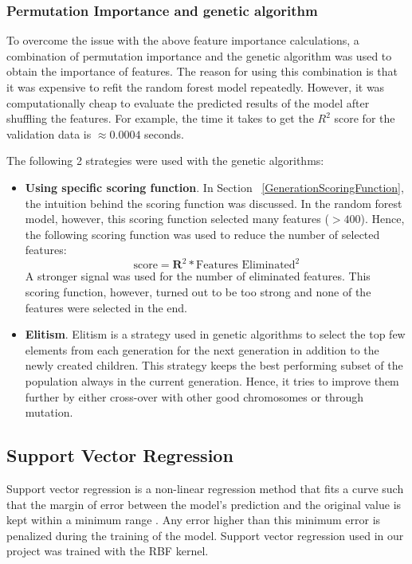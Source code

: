 \documentclass[11pt]{article}
\begin{document}
\subsubsection{Permutation Importance and genetic algorithm}
To overcome the issue with the above feature importance calculations, a combination of permutation importance and the genetic algorithm was used to obtain the importance of features.
The reason for using this combination is that it was expensive to refit the random forest model repeatedly. However, it was computationally cheap to evaluate the predicted results of the model after shuffling the features.
For example,  the time it takes to get the $R^2$ score for the validation data is $\approx 0.0004$ seconds.

The following 2 strategies were used with the genetic algorithms:
\begin{itemize}
\item \textbf{Using specific scoring function}.  In Section ~\ref{GenerationScoringFunction},  the intuition behind the scoring function was discussed.
In the random forest model,  however,  this scoring function selected many features ($> 400$). Hence, the following scoring function was used to reduce the number of selected features:
$$
\textrm{score} = \mathbf{R}^2 * \textrm{Features Eliminated}^2
$$
A stronger signal was used for the number of eliminated features. This scoring function, however,  turned out to be too strong and none of the features were selected in the end.
\item \textbf{Elitism}.  Elitism is a strategy used in genetic algorithms to select the top few elements from each generation for the next generation in addition to the newly created children. This strategy keeps the best performing subset of the population always in the current generation. Hence, it tries to improve them further by either cross-over with other good chromosomes or through mutation.
\end{itemize}


\subsection{Support Vector Regression}
Support vector regression is a non-linear regression method that fits a curve such that the margin of error between the model's prediction and the original value is kept within a minimum range \cite{supportvectorregressionpaper}.
Any error higher than this minimum error is penalized during the training of the model.
Support vector regression used in our project was trained with the RBF kernel.
\end{document}
